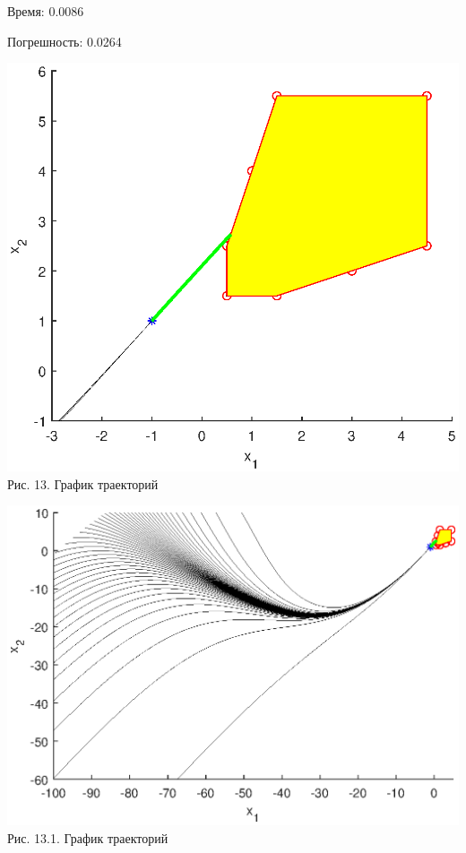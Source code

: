 \documentclass{article}
\theoremstyle{definition}
\begin{document}
Время: 0.0086

Погрешность: 0.0264

\begin{center}
{\includegraphics[width=15cm]{example5.eps}}
{Рис. 13. График траекторий}
\end{center}

\begin{center}
{\includegraphics[width=15cm]{example55.eps}}
{Рис. 13.1. График траекторий}
\end{center}
\end{document}
